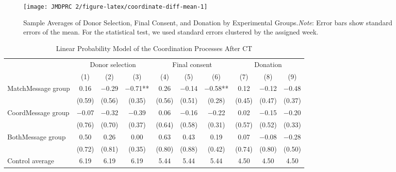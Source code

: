 \documentclass[12pt, a4paper]{article}
\begin{document}
\begin{table}[H]
\begin{threeparttable}
\begin{tablenotes}
\end{tablenotes}
\end{threeparttable}
\end{table}

\begin{figure}[H]
\texttt{[image: JMDPRC~2/figure-latex/coordinate-diff-mean-1]} \caption{Sample Averages of Donor Selection, Final Consent, and Donation by Experimental Groups.\newline \emph{Note}: Error bars show standard errors of the mean. For the statistical test, we used standard errors clustered by the assigned week.}\label{fig:coordinate-diff-mean}
\end{figure}

\begin{table}[H]

\caption{\label{tab:lm-coordinate}Linear Probability Model of the Coordination Processes After CT}
\centering
\fontsize{8}{10}\selectfont
\begin{threeparttable}
\begin{tabular}[t]{lccccccccc}
\toprule
\multicolumn{1}{c}{ } & \multicolumn{3}{c}{Donor selection} & \multicolumn{3}{c}{Final consent} & \multicolumn{3}{c}{Donation} \\
\cmidrule(l{3pt}r{3pt}){2-4} \cmidrule(l{3pt}r{3pt}){5-7} \cmidrule(l{3pt}r{3pt}){8-10}
  & (1) & (2) & (3) & (4) & (5) & (6) & (7) & (8) & (9)\\
\midrule
MatchMessage group & \num{0.16} & \num{-0.29} & \num{-0.71}** & \num{0.26} & \num{-0.14} & \num{-0.58}** & \num{0.12} & \num{-0.12} & \num{-0.48}\\
 & (\num{0.59}) & (\num{0.56}) & (\num{0.35}) & (\num{0.56}) & (\num{0.51}) & (\num{0.28}) & (\num{0.45}) & (\num{0.47}) & (\num{0.37})\\
CoordMessage group & \num{-0.07} & \num{-0.32} & \num{-0.39} & \num{0.06} & \num{-0.16} & \num{-0.22} & \num{0.02} & \num{-0.15} & \num{-0.20}\\
 & (\num{0.76}) & (\num{0.70}) & (\num{0.37}) & (\num{0.64}) & (\num{0.58}) & (\num{0.31}) & (\num{0.57}) & (\num{0.52}) & (\num{0.33})\\
BothMessage group & \num{0.50} & \num{0.26} & \num{0.00} & \num{0.63} & \num{0.43} & \num{0.19} & \num{0.07} & \num{-0.08} & \num{-0.28}\\
 & (\num{0.72}) & (\num{0.81}) & (\num{0.35}) & (\num{0.80}) & (\num{0.88}) & (\num{0.42}) & (\num{0.74}) & (\num{0.80}) & (\num{0.50})\\
\midrule
Control average & 6.19 & 6.19 & 6.19 & 5.44 & 5.44 & 5.44 & 4.50 & 4.50 & 4.50\\

\end{tabular}
\end{threeparttable}
\end{table}
\end{document}
